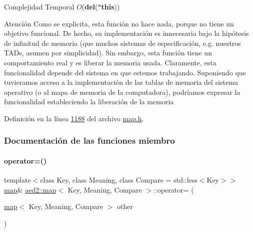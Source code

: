 \begin{DoxyDescription}
\item[Complejidad Temporal]$O$({\bfseries del}({\bfseries $\ast$this}))
\end{DoxyDescription}

\begin{DoxyAttention}{Atención}
Como se explicita, esta función no hace nada, porque no tiene un objetivo funcional. De hecho, su implementación es innecesaria bajo la hipótesis de infinitud de memoria (que muchos sistemas de especificación, e.\+g. nuestros T\+A\+Ds, asumen por simplicidad). Sin embargo, esta función tiene un comportamiento real y es liberar la memoria usada. Claramente, esta funcionalidad depende del sistema en que estemos trabajando. Suponiendo que tuvieramos acceso a la implementación de las tablas de memoria del sistema operativo (o al mapa de memoria de la computadora), podríamos expresar la funcionalidad estableciendo la liberación de la memoria 
\end{DoxyAttention}


Definición en la línea \hyperlink{map_8h_source_l01188}{1188} del archivo \hyperlink{map_8h_source}{map.\+h}.



\subsubsection{Documentación de las funciones miembro}
\mbox{\label{classaed2_1_1map_ac606d334809066929522964d45e76317_ac606d334809066929522964d45e76317}} 
\paragraph{\texorpdfstring{operator=()}{operator=()}}
{\footnotesize\ttfamily template$<$class Key, class Meaning, class Compare = std\+::less$<$\+Key$>$$>$ \\
\hyperlink{classaed2_1_1map}{map}\& \hyperlink{classaed2_1_1map}{aed2\+::map}$<$ Key, Meaning, Compare $>$\+::operator= (\begin{DoxyParamCaption}\item[{\hyperlink{classaed2_1_1map}{map}$<$ Key, Meaning, Compare $>$}]{other }\end{DoxyParamCaption})\hspace{0.3cm}{\ttfamily [inline]}}



